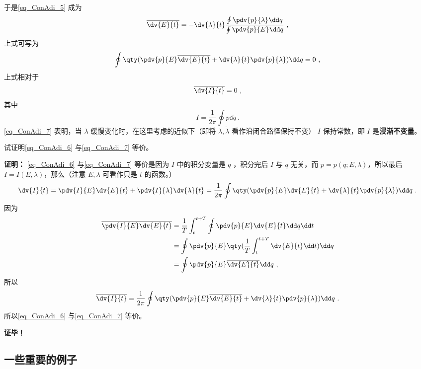 于是\autoref{eq_ConAdi_5} 成为
\begin{equation}
\overline{\dv{E}{t}}=-\dv{\lambda}{t}
\frac{\oint\pdv{p}{\lambda}\dd q}
{\oint\pdv{p}{E}\dd q}~,
\end{equation}
上式可写为
\begin{equation}\label{eq_ConAdi_6}
\oint\qty(\pdv{p}{E}\overline{\dv{E}{t}}+\dv{\lambda}{t}\pdv{p}{\lambda})\dd q=0~,
\end{equation}
上式相对于
\begin{equation}\label{eq_ConAdi_7}
\overline{\dv{I}{t}}=0~,
\end{equation}
其中
\begin{equation}
I=\frac{1}{2\pi}\oint p\dd q~.
\end{equation}
 \autoref{eq_ConAdi_7} 表明，当 $\lambda$ 缓慢变化时，在这里考虑的近似下（即将 $\lambda,\dot\lambda$ 看作沿闭合路径保持不变） $I$ 保持常数，即 $I$ 是\textbf{浸渐不变量}。
\begin{exercise}{}
试证明\autoref{eq_ConAdi_6} 与\autoref{eq_ConAdi_7} 等价。

\textbf{证明：}
\autoref{eq_ConAdi_6} 与\autoref{eq_ConAdi_7} 等价是因为 $I$ 中的积分变量是 $q$ ，积分完后 $I$ 与 $q$ 无关，而 $p=p(q;E,\lambda)$，所以最后 $I=I(E,\lambda)$，那么（注意 $E,\lambda$ 可看作只是 $t$ 的函数。）
\begin{equation}
\dv{I}{t}=\pdv{I}{E}\dv{E}{t}+\pdv{I}{\lambda}\dv{\lambda}{t}=\frac{1}{2\pi}\oint\qty(\pdv{p}{E}\dv{E}{t}+\dv{\lambda}{t}\pdv{p}{\lambda})\dd q~.
\end{equation}
因为
  \begin{equation}
  \begin{aligned}
\overline{\pdv{I}{E}\dv{E}{t}}&=\frac{1}{T}\int_t^{t+T}\oint\pdv{p}{E}\dv{E}{t}\dd q\dd t\\
&=\oint\pdv{p}{E}\qty(\frac{1}{T}\int_t^{t+T}\dv{E}{t}\dd t)\dd q\\
&=\oint\pdv{p}{E}\overline{\dv{E}{t}}\dd q~,
\end{aligned}
\end{equation}
所以
\begin{equation}
\overline{\dv{I}{t}}=\frac{1}{2\pi}\oint\qty(\pdv{p}{E}\overline{\dv{E}{t}}+\dv{\lambda}{t}\pdv{p}{\lambda})\dd q~.
\end{equation}
所以\autoref{eq_ConAdi_6} 与\autoref{eq_ConAdi_7} 等价。

\textbf{证毕！}
\end{exercise}
 \subsection{一些重要的例子}